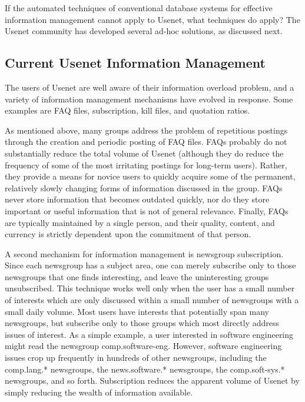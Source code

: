 If the automated techniques of conventional database systems for effective
information management cannot apply to Usenet, what techniques do apply?
The Usenet community has developed several ad-hoc solutions, as discussed
next.

\subsection{Current Usenet Information Management}

The users of Usenet are well aware of their information overload problem,
and a variety of information management mechanisms have evolved in
response. Some examples are FAQ files, subscription, kill files, and
quotation ratios.

As mentioned above, many groups address the problem of repetitious postings
through the creation and periodic posting of FAQ files.  FAQs probably do
not substantially reduce the total volume of Usenet (although they do
reduce the frequency of some of the most irritating postings for long-term
users). Rather, they provide a means for novice users to quickly acquire
some of the permanent, relatively slowly changing forms of information
discussed in the group.  FAQs never store information that becomes outdated
quickly, nor do they store important or useful information that is not of
general relevance.  Finally, FAQs are typically maintained by a single
person, and their quality, content, and currency is strictly dependent upon
the commitment of that person.

A second mechanism for information management is newsgroup subscription. Since
each newsgroup has a subject area, one can merely subscribe only to those
newsgroups that one finds interesting, and leave the uninteresting groups
unsubscribed. This technique works well only when the user has a small number
of interests which are only discussed within a small number of newsgroups with
a small daily volume.  Most users have interests that potentially span many
newsgroups, but subscribe only to those groups which most directly address
issues of interest.  As a simple example, a user interested in software
engineering might read the newsgroup comp.software-eng.  However, software
engineering issues crop up frequently in hundreds of other newsgroups,
including the comp.lang.* newsgroups, the news.software.* newsgroups, the
comp.soft-sys.* newsgroups, and so forth.  Subscription reduces the apparent
volume of Usenet by simply reducing the wealth of information available.

